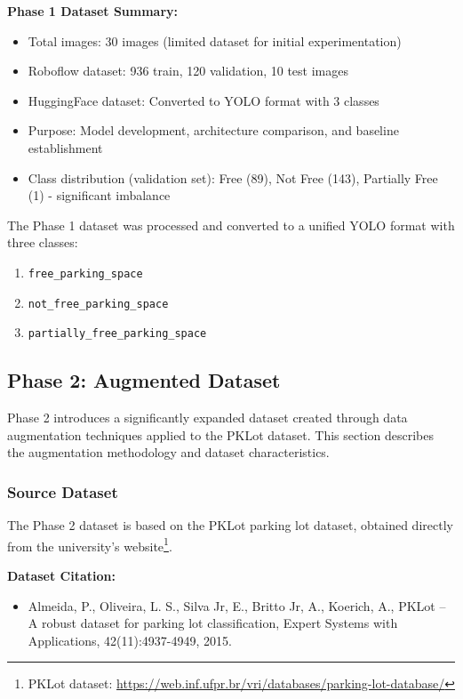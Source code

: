 \documentclass[12pt,a4paper]{article}
\begin{document}
\textbf{Phase 1 Dataset Summary:}
\begin{itemize}
    \item Total images: 30 images (limited dataset for initial experimentation)
    \item Roboflow dataset: 936 train, 120 validation, 10 test images
    \item HuggingFace dataset: Converted to YOLO format with 3 classes
    \item Purpose: Model development, architecture comparison, and baseline establishment
    \item Class distribution (validation set): Free (89), Not Free (143), Partially Free (1) - significant imbalance
\end{itemize}

The Phase 1 dataset was processed and converted to a unified YOLO format with three classes:
\begin{enumerate}
    \item \texttt{free\_parking\_space}
    \item \texttt{not\_free\_parking\_space}
    \item \texttt{partially\_free\_parking\_space}
\end{enumerate}

\subsection{Phase 2: Augmented Dataset}

Phase 2 introduces a significantly expanded dataset created through data augmentation techniques applied to the PKLot dataset. This section describes the augmentation methodology and dataset characteristics.

\subsubsection{Source Dataset}

The Phase 2 dataset is based on the PKLot parking lot dataset, obtained directly from the university's website\footnote{PKLot dataset: \url{https://web.inf.ufpr.br/vri/databases/parking-lot-database/}}.

\textbf{Dataset Citation:}
\begin{itemize}
    \item Almeida, P., Oliveira, L. S., Silva Jr, E., Britto Jr, A., Koerich, A., PKLot – A robust dataset for parking lot classification, Expert Systems with Applications, 42(11):4937-4949, 2015.
\end{itemize}
\end{document}
